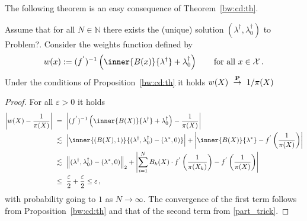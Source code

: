 The following theorem is an easy consequence of Theorem~\ref{bw:cd:th}.
\begin{ftheorem}
  \label{aa:weights:th}
  Assume that for all $N\in\mathbb{N}$ there exists the (unique) solution $(\lambda^\dagger,\lambda_0^\dagger)$
  to Problem?.
  Consider the weights function defined by
  \begin{gather}
    w(x)
    :=
    (
    f^{'}
    )^{-1}
    \left( 
      \inner{B(x)}{\lambda^\dagger}
      +
      \lambda_0^\dagger
    \right)
    \qquad
    \text{for all}\ 
    x\in\mathcal{X}
    \,.
  \end{gather}
  Under the conditions of Proposition~\ref{bw:cd:th} 
  it holds
  $w(X)\ 
  \overset{\P}{\to}
  \ 
  1/\pi(X)
  $
\end{ftheorem}
\begin{proof}
  For all $\varepsilon>0$ it holds
\begin{align}
  \begin{split}
  \left| 
  w(X)
  -
  \frac{1}{\pi(X)}
  \right|
  &
  \ 
  =
  \ 
  \left| 
  (f^{'})^{-1}
  \left( 
    \inner{B(X)}
    {\lambda^\dagger}
    +
    \lambda_0^\dagger
  \right)
  -
  \frac{1}{\pi(X)}
  \right|
  \\
  &
  \ 
  \lesssim
  \ 
  \left| 
    \inner{(B(X),1)}
    {
      (\lambda^\dagger,\lambda_0^\dagger)
      -
      (\lambda^*,0)
    }
  \right|
  +
  \left| 
    \inner{B(X)}
    {
      \lambda^*
      }
    -
    f^{'}
    \left( 
  \frac{1}{\pi(X)}
    \right)
  \right|
  \\
  &
  \ 
  \lesssim
  \ 
  \norm{
      (\lambda^\dagger,\lambda_0^\dagger)
      -
      (\lambda^*,0)
}_2
  +
  \left| 
  \sum_{i=1}^{N} 
  B_k(X)
  \cdot
    f^{'}
    \left( 
  \frac{1}{\pi(X_k)}
    \right)
    -
    f^{'}
    \left( 
  \frac{1}{\pi(X)}
    \right)
  \right|
  \\
  &
  \ 
  \le
  \ 
  \frac{\varepsilon}{2}
+
  \frac{\varepsilon}{2}
  \le
  \varepsilon
  \,,
\end{split}
\end{align}
with probability going to $1$ as $N\to\infty$.
The convergence of the first term follows from Proposition~\ref{bw:cd:th} and that of the second term from \eqref{part_trick}.
\end{proof}
